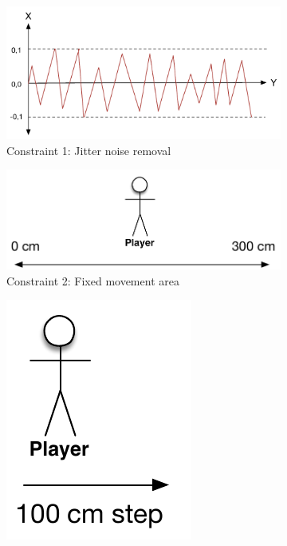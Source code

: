 \begin{figure}[H]
	\centering
	\begin{subfigure}[b]{0.9\textwidth}
		\centering
		\includegraphics[scale = 0.45]{media/constraints/01-jitter-noise}
		\caption{Constraint 1: Jitter noise removal}
		\label{figure:jitter-noise}
	\end{subfigure}
	\begin{subfigure}[b]{0.45\textwidth}
		\centering
		\includegraphics[scale = 0.45]{media/constraints/02-fixed-movement-area}
		\caption{Constraint 2: Fixed movement area}
		\label{figure:fixed-movement-area}
	\end{subfigure}
	\qquad
	\begin{subfigure}[b]{0.45\textwidth}
		\centering
		\includegraphics[scale = 0.45]{media/constraints/03-maximum-step}

\end{subfigure}
\end{figure}
